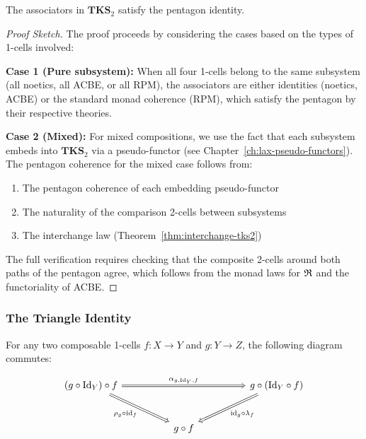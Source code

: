 \begin{theorem}
\label{thm:tks-pentagon}
The associators in $\mathbf{TKS}_2$ satisfy the pentagon identity.
\end{theorem}

\begin{proof}[Proof Sketch]
The proof proceeds by considering the cases based on the types of 1-cells involved:

\textbf{Case 1 (Pure subsystem):} When all four 1-cells belong to the same subsystem
(all noetics, all ACBE, or all RPM), the associators are either identities (noetics, ACBE)
or the standard monad coherence (RPM), which satisfy the pentagon by their respective
theories.

\textbf{Case 2 (Mixed):} For mixed compositions, we use the fact that each subsystem
embeds into $\mathbf{TKS}_2$ via a pseudo-functor (see Chapter~\ref{ch:lax-pseudo-functors}).
The pentagon coherence for the mixed case follows from:
\begin{enumerate}
  \item The pentagon coherence of each embedding pseudo-functor
  \item The naturality of the comparison 2-cells between subsystems
  \item The interchange law (Theorem~\ref{thm:interchange-tks2})
\end{enumerate}

The full verification requires checking that the composite 2-cells around both paths
of the pentagon agree, which follows from the monad laws for $\mathfrak{R}$ and the functoriality
of ACBE.
\end{proof}

\subsubsection{The Triangle Identity}

\begin{definition}
\label{def:triangle}
For any two composable 1-cells $f : X \to Y$ and $g : Y \to Z$, the following
diagram commutes:

\[
\begin{tikzcd}[column sep=huge, row sep=large]
  (g \circ \mathrm{Id}_Y) \circ f
    \arrow[rr, Rightarrow, "\alpha_{g, \mathrm{Id}_Y, f}"]
    \arrow[dr, Rightarrow, "\rho_g \circ \mathrm{id}_f"']
  & &
  g \circ (\mathrm{Id}_Y \circ f)
    \arrow[dl, Rightarrow, "\mathrm{id}_g \circ \lambda_f"]
  \\
  & g \circ f &
\end{tikzcd}
\]
\end{definition}

